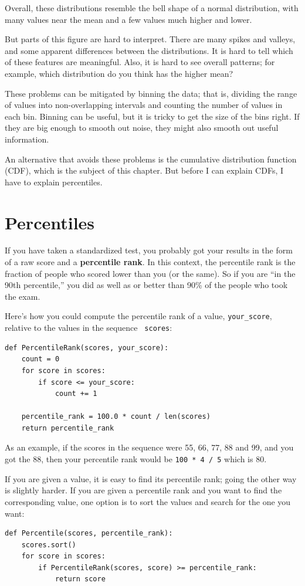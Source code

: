 \documentclass[12pt]{book}
\theoremstyle{exercise}
\begin{document}
Overall, these distributions resemble the bell shape of a normal
distribution, with many values near the mean and a few values much
higher and lower.

But parts of this figure are hard to interpret.  There are many spikes
and valleys, and some apparent differences between the distributions.
It is hard to tell which of these features are meaningful.  Also, it
is hard to see overall patterns; for example, which distribution do
you think has the higher mean?%

These problems can be mitigated by binning the data; that is, dividing
the range of values into non-overlapping intervals and counting the
number of values in each bin.  Binning can be useful, but it is tricky
to get the size of the bins right.  If they are big enough to smooth
out noise, they might also smooth out useful information.

An alternative that avoids these problems is the cumulative
distribution function (CDF), which is the subject of this chapter.
But before I can explain CDFs, I have to explain percentiles.%


\section{Percentiles}%

If you have taken a standardized test, you probably got your
results in the form of a raw score and a {\bf percentile rank}.
In this context, the percentile rank is the fraction of people who
scored lower than you (or the same).  So if you are ``in the 90th
percentile,'' you did as well as or better than 90\% of the people who
took the exam.

Here's how you could compute the percentile rank of a value,
\verb"your_score", relative to the values in the sequence {\tt
  scores}:
%
\begin{verbatim}
def PercentileRank(scores, your_score):
    count = 0
    for score in scores:
        if score <= your_score:
            count += 1

    percentile_rank = 100.0 * count / len(scores)
    return percentile_rank
\end{verbatim}

As an example, if the
scores in the sequence were 55, 66, 77, 88 and 99, and you got the 88,
then your percentile rank would be {\tt 100 * 4 / 5} which is 80.

If you are given a value, it is easy to find its percentile rank; going
the other way is slightly harder.  If you are given a percentile rank
and you want to find the corresponding value, one option is to
sort the values and search for the one you want:
%
\begin{verbatim}
def Percentile(scores, percentile_rank):
    scores.sort()
    for score in scores:
        if PercentileRank(scores, score) >= percentile_rank:
            return score
\end{verbatim}
\end{document}
